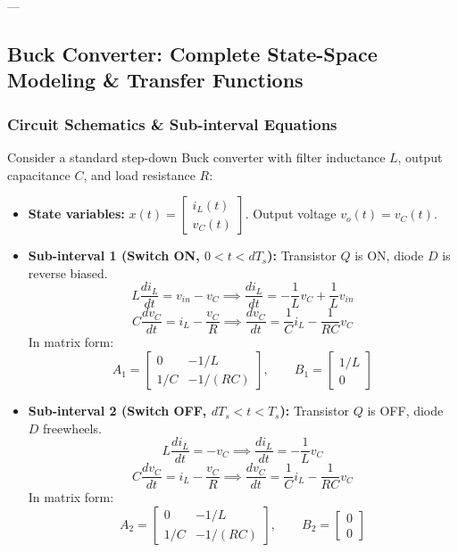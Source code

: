 ---

\subsection{Buck Converter: Complete State-Space Modeling \& Transfer Functions}

\subsubsection{Circuit Schematics \& Sub-interval Equations}
Consider a standard step-down Buck converter with filter inductance $L$, output capacitance $C$, and load resistance $R$:
\begin{itemize}
  \item \textbf{State variables:} $x(t) = \begin{bmatrix} i_L(t) \\ v_C(t) \end{bmatrix}$. Output voltage $v_o(t) = v_C(t)$.
  \item \textbf{Sub-interval 1 (Switch ON, $0 < t < d T_s$):}
  Transistor $Q$ is ON, diode $D$ is reverse biased.
  \begin{equation}
  L \frac{di_L}{dt} = v_{in} - v_C \implies \frac{di_L}{dt} = -\frac{1}{L} v_C + \frac{1}{L} v_{in}
  \end{equation}
  \begin{equation}
  C \frac{dv_C}{dt} = i_L - \frac{v_C}{R} \implies \frac{dv_C}{dt} = \frac{1}{C} i_L - \frac{1}{RC} v_C
  \end{equation}
  In matrix form:
  \begin{equation}
  A_1 = \begin{bmatrix} 0 & -1/L \\ 1/C & -1/(RC) \end{bmatrix}, \qquad B_1 = \begin{bmatrix} 1/L \\ 0 \end{bmatrix}
  \end{equation}

  \item \textbf{Sub-interval 2 (Switch OFF, $d T_s < t < T_s$):}
  Transistor $Q$ is OFF, diode $D$ freewheels.
  \begin{equation}
  L \frac{di_L}{dt} = -v_C \implies \frac{di_L}{dt} = -\frac{1}{L} v_C
  \end{equation}
  \begin{equation}
  C \frac{dv_C}{dt} = i_L - \frac{v_C}{R} \implies \frac{dv_C}{dt} = \frac{1}{C} i_L - \frac{1}{RC} v_C
  \end{equation}
  In matrix form:
  \begin{equation}
  A_2 = \begin{bmatrix} 0 & -1/L \\ 1/C & -1/(RC) \end{bmatrix}, \qquad B_2 = \begin{bmatrix} 0 \\ 0 \end{bmatrix}
  \end{equation}
\end{itemize}

